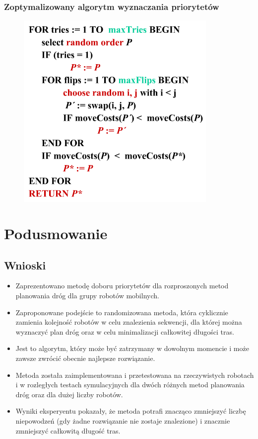 \subsubsection{Zoptymalizowany algorytm wyznaczania priorytetów}
\begin{figure}[htp]
	\centering
	\includegraphics[width=\textwidth,height=0.7\textheight,keepaspectratio]{img/article1/ppt-alg2}
\end{figure}

\section{Podusmowanie}
\subsection{Wnioski}
\begin{itemize}
	\item Zaprezentowano metodę doboru priorytetów dla rozproszonych metod planowania dróg dla grupy robotów mobilnych.
	\item Zaproponowane podejście to randomizowana metoda, która cyklicznie zamienia kolejność robotów w celu znalezienia sekwencji, dla której można wyznaczyć plan dróg oraz w celu minimalizacji całkowitej długości tras.
	\item Jest to algorytm, który może być zatrzymany w dowolnym momencie i może zawsze zwrócić obecnie najlepsze rozwiązanie.
	\item Metoda została zaimplementowana i przetestowana na rzeczywistych robotach i w rozległych testach symulacyjnych dla dwóch różnych metod planowania dróg oraz dla dużej liczby robotów.
	\item Wyniki eksperyentu pokazały, że metoda potrafi znacząco zmniejszyć liczbę niepowodzeń (gdy żadne rozwiązanie nie zostaje znalezione) i znacznie zmniejszyć całkowitą długość tras.
\end{itemize}
